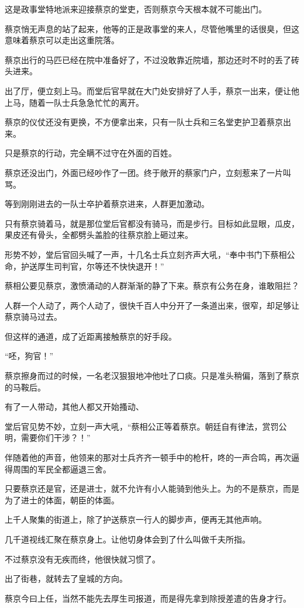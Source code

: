 这是政事堂特地派来迎接蔡京的堂吏，否则蔡京今天根本就不可能出门。

蔡京悄无声息的站了起来，他等的正是政事堂的来人，尽管他嘴里的话很臭，但这意味着蔡京可以走出这重院落。

蔡京出行的马匹已经在院中准备好了，不过没敢靠近院墙，那边还时不时的丢了砖头进来。

出了厅，便立刻上马。而堂后官早就在大门处安排好了人手，蔡京一出来，便让他上马，随着一队士兵急急忙忙的离开。

蔡京的仪仗还没有更换，不方便拿出来，只有一队士兵和三名堂吏护卫着蔡京出来。

只是蔡京的行动，完全瞒不过守在外面的百姓。

蔡京还没出门，外面已经吵作了一团。终于敞开的蔡家门户，立刻惹来了一片叫骂。

等到刚刚进去的一队士卒护着蔡京进来，人群更加激动。

只有蔡京骑着马，就是那位堂后官都没有骑马，而是步行。目标如此显眼，瓜皮，果皮还有骨头，全都劈头盖脸的往蔡京脸上砸过来。

形势不妙，堂后官回头喊了一声，十几名士兵立刻齐声大吼，“奉中书门下蔡相公命，护送厚生司判官，尔等还不快快退开！”

蔡相公要见蔡京，激愤涌动的人群渐渐的静了下来。蔡京有公务在身，谁敢阻拦？

人群一个人动了，两个人动了，很快千百人中分开了一条道出来，很窄，却足够让蔡京骑马过去。

但这样的通道，成了近距离接触蔡京的好手段。

“呸，狗官！”

蔡京擦身而过的时候，一名老汉狠狠地冲他吐了口痰。只是准头稍偏，落到了蔡京的马鞍后。

有了一人带动，其他人都又开始搔动、

堂后官见势不妙，立刻一声大吼，“蔡相公正等着蔡京。朝廷自有律法，赏罚公明，需要你们干涉？！”

伴随着他的声音，他领来的那对士兵齐齐一顿手中的枪杆，咚的一声合鸣，再次逼得周围的军民全都逼退三舍。

只要蔡京还是官，还是进士，就不允许有小人能骑到他头上。为的不是蔡京，而是为了进士的体面，朝臣的体面。

上千人聚集的街道上，除了护送蔡京一行人的脚步声，便再无其他声响。

几千道视线汇聚在蔡京身上。让他切身体会到了什么叫做千夫所指。

不过蔡京没有无疾而终，他很快就习惯了。

出了街巷，就转去了皇城的方向。

蔡京今曰上任，当然不能先去厚生司报道，而是得先拿到除授差遣的告身才行。

